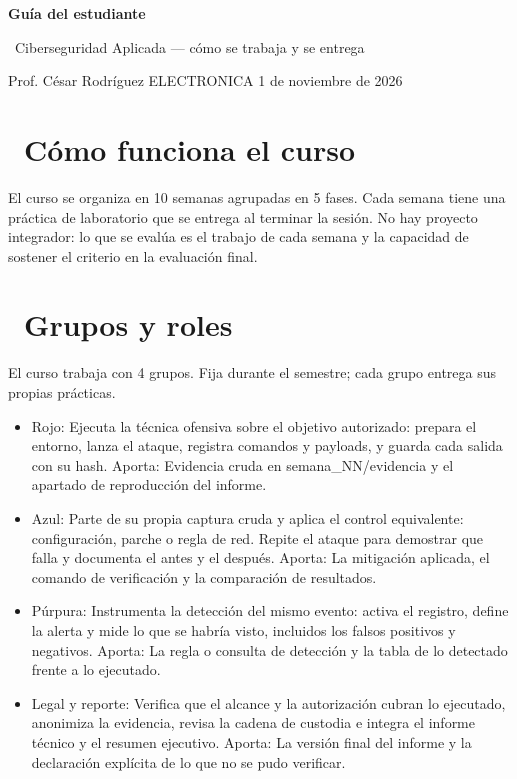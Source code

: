 \documentclass[11pt,a4paper]{article}
\newcommand{\iconoBanda}{microchip}
\newcommand{\bandaTitulo}[3][fondoOscuro]{%
  \begin{tcolorbox}[
    enhanced,
    colback=#1, colframe=#1,
    boxrule=0pt, arc=8pt, outer arc=8pt,
    width=\linewidth,
    top=18pt, bottom=6pt, left=14pt, right=14pt,
    borderline south={3.5pt}{0pt}{cyanNeon},
  ]
    \begin{minipage}[c]{0.07\linewidth}
      \centering
      \textcolor{cyanNeon}{\fontsize{30}{30}\selectfont\faIcon{\iconoBanda}}
    \end{minipage}%
    \hspace{8pt}%
    \begin{minipage}[c]{0.88\linewidth}
      {\fontsize{20}{24}\selectfont\bfseries\color{white}#2}\par\vspace{5pt}%
      \textcolor{cyanNeon!80!white}{\small\faIcon{angle-right}~#3}%
    \end{minipage}
    \vspace{4pt}
  \end{tcolorbox}%
  \vspace{8pt}%
}
\newcommand{\iconotexto}[2]{\textcolor{cyanNeon}{\faIcon{#1}}~#2}
\renewcommand{\iconoBanda}{shield-alt}
\begin{document}
\bandaTitulo[fondoOscuro]{Guía del estudiante}{Ciberseguridad Aplicada --- cómo se trabaja y se entrega}

\begin{center}\small\color{grisTexto}Prof. César Rodríguez \textbar{} ELECTRONICA \textbar{} 1 de noviembre de 2026\end{center}

\section{\iconotexto{info-circle}{Cómo funciona el curso}}

El curso se organiza en 10 semanas agrupadas en 5 fases. Cada semana tiene una práctica de laboratorio que se entrega al terminar la sesión. No hay proyecto integrador: lo que se evalúa es el trabajo de cada semana y la capacidad de sostener el criterio en la evaluación final.

\section{\iconotexto{users}{Grupos y roles}}

El curso trabaja con 4 grupos. Fija durante el semestre; cada grupo entrega sus propias prácticas.

\begin{itemize}[leftmargin=1.4em,itemsep=2pt,topsep=3pt]
  \item Rojo: Ejecuta la técnica ofensiva sobre el objetivo autorizado: prepara el entorno, lanza el ataque, registra comandos y payloads, y guarda cada salida con su hash. Aporta: Evidencia cruda en semana\_NN/evidencia y el apartado de reproducción del informe.
  \item Azul: Parte de su propia captura cruda y aplica el control equivalente: configuración, parche o regla de red. Repite el ataque para demostrar que falla y documenta el antes y el después. Aporta: La mitigación aplicada, el comando de verificación y la comparación de resultados.
  \item Púrpura: Instrumenta la detección del mismo evento: activa el registro, define la alerta y mide lo que se habría visto, incluidos los falsos positivos y negativos. Aporta: La regla o consulta de detección y la tabla de lo detectado frente a lo ejecutado.
  \item Legal y reporte: Verifica que el alcance y la autorización cubran lo ejecutado, anonimiza la evidencia, revisa la cadena de custodia e integra el informe técnico y el resumen ejecutivo. Aporta: La versión final del informe y la declaración explícita de lo que no se pudo verificar.
\end{itemize}
\end{document}
